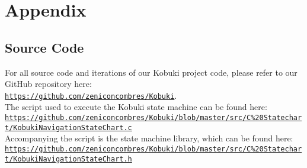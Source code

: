 \newpage
\section{Appendix}
\subsection{Source Code}
For all source code and iterations of our Kobuki project code, please refer to our GitHub repository here:\\ \texttt{\url{https://github.com/zeniconcombres/Kobuki}}.\\
The script used to execute the Kobuki state machine can be found here: 
\texttt{\url{https://github.com/zeniconcombres/Kobuki/blob/master/src/C\%20Statechart/KobukiNavigationStateChart.c}}\\
Accompanying the script is the state machine library, which can be found here:
\texttt{\url{https://github.com/zeniconcombres/Kobuki/blob/master/src/C\%20Statechart/KobukiNavigationStateChart.h}}